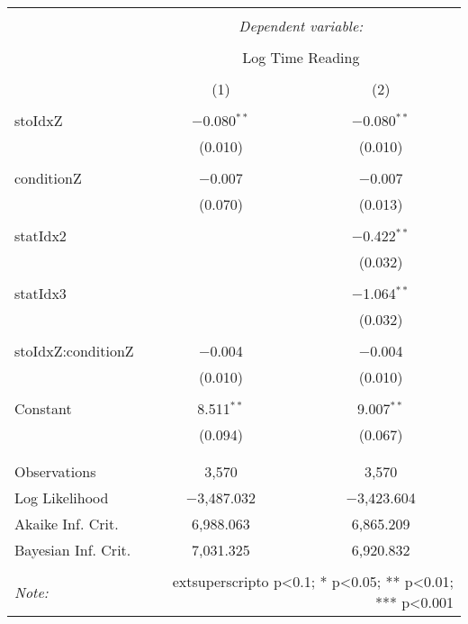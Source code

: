
\begin{table}[!htbp] \centering 
  \caption{} 
  \label{} 
\begin{tabular}{@{\extracolsep{5pt}}lcc} 
\\[-1.8ex]\hline 
\hline \\[-1.8ex] 
 & \multicolumn{2}{c}{\textit{Dependent variable:}} \\ 
\cline{2-3} 
\\[-1.8ex] & \multicolumn{2}{c}{Log Time Reading} \\ 
\\[-1.8ex] & (1) & (2)\\ 
\hline \\[-1.8ex] 
 stoIdxZ & $-$0.080$^{**}$ & $-$0.080$^{**}$ \\ 
  & (0.010) & (0.010) \\ 
  & & \\ 
 conditionZ & $-$0.007 & $-$0.007 \\ 
  & (0.070) & (0.013) \\ 
  & & \\ 
 statIdx2 &  & $-$0.422$^{**}$ \\ 
  &  & (0.032) \\ 
  & & \\ 
 statIdx3 &  & $-$1.064$^{**}$ \\ 
  &  & (0.032) \\ 
  & & \\ 
 stoIdxZ:conditionZ & $-$0.004 & $-$0.004 \\ 
  & (0.010) & (0.010) \\ 
  & & \\ 
 Constant & 8.511$^{**}$ & 9.007$^{**}$ \\ 
  & (0.094) & (0.067) \\ 
  & & \\ 
\hline \\[-1.8ex] 
Observations & 3,570 & 3,570 \\ 
Log Likelihood & $-$3,487.032 & $-$3,423.604 \\ 
Akaike Inf. Crit. & 6,988.063 & 6,865.209 \\ 
Bayesian Inf. Crit. & 7,031.325 & 6,920.832 \\ 
\hline 
\hline \\[-1.8ex] 
\textit{Note:}  & \multicolumn{2}{r}{	extsuperscript{o} p<0.1; * p<0.05; ** p<0.01; *** p<0.001} \\ 
\end{tabular} 
\end{table} 
